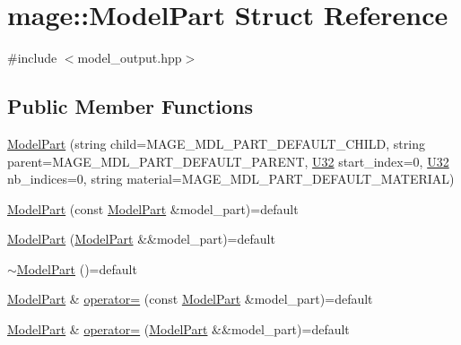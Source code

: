 \hypertarget{structmage_1_1_model_part}{}\section{mage\+:\+:Model\+Part Struct Reference}
\label{structmage_1_1_model_part}


{\ttfamily \#include $<$model\+\_\+output.\+hpp$>$}

\subsection*{Public Member Functions}
\begin{DoxyCompactItemize}
\item 
\hyperlink{structmage_1_1_model_part_a3a8eae99c65e242e62786c83abd6a425}{Model\+Part} (string child=M\+A\+G\+E\+\_\+\+M\+D\+L\+\_\+\+P\+A\+R\+T\+\_\+\+D\+E\+F\+A\+U\+L\+T\+\_\+\+C\+H\+I\+LD, string parent=M\+A\+G\+E\+\_\+\+M\+D\+L\+\_\+\+P\+A\+R\+T\+\_\+\+D\+E\+F\+A\+U\+L\+T\+\_\+\+P\+A\+R\+E\+NT, \hyperlink{namespacemage_a41c104c036fba3756a74e19f793eeaa1}{U32} start\+\_\+index=0, \hyperlink{namespacemage_a41c104c036fba3756a74e19f793eeaa1}{U32} nb\+\_\+indices=0, string material=M\+A\+G\+E\+\_\+\+M\+D\+L\+\_\+\+P\+A\+R\+T\+\_\+\+D\+E\+F\+A\+U\+L\+T\+\_\+\+M\+A\+T\+E\+R\+I\+AL)
\item 
\hyperlink{structmage_1_1_model_part_a3c39c2c312f07687f8ad5c2c2580d1e2}{Model\+Part} (const \hyperlink{structmage_1_1_model_part}{Model\+Part} \&model\+\_\+part)=default
\item 
\hyperlink{structmage_1_1_model_part_af8744793e9e6eccd59211c87ffc8e745}{Model\+Part} (\hyperlink{structmage_1_1_model_part}{Model\+Part} \&\&model\+\_\+part)=default
\item 
\hyperlink{structmage_1_1_model_part_a3322c5c7924ec30be170ae1ed6dca550}{$\sim$\+Model\+Part} ()=default
\item 
\hyperlink{structmage_1_1_model_part}{Model\+Part} \& \hyperlink{structmage_1_1_model_part_a37e9d66b701ed84111160bf5a003b658}{operator=} (const \hyperlink{structmage_1_1_model_part}{Model\+Part} \&model\+\_\+part)=default
\item 
\hyperlink{structmage_1_1_model_part}{Model\+Part} \& \hyperlink{structmage_1_1_model_part_a8337b8034d9a43514690a2db3d0f43c7}{operator=} (\hyperlink{structmage_1_1_model_part}{Model\+Part} \&\&model\+\_\+part)=default
\end{DoxyCompactItemize}
